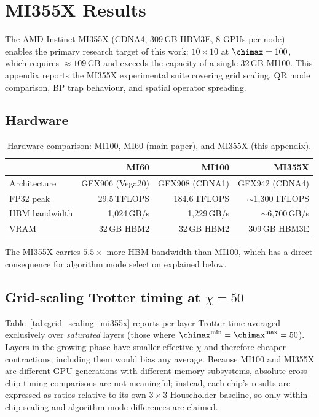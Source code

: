 \section{MI355X Results}
\label{app:mi355x}

The AMD Instinct MI355X (CDNA4, 309\,GB HBM3E, 8 GPUs per node) enables
the primary research target of this work: $10\times10$ at
$\chimax=100$, which requires $\approx 109$\,GB and exceeds the capacity of a
single 32\,GB MI100.
This appendix reports the MI355X experimental suite covering grid scaling,
QR mode comparison, BP trap behaviour, and spatial operator spreading.

\subsection{Hardware}

\begin{table}[ht]
\centering
\caption{Hardware comparison: MI100, MI60 (main paper), and MI355X (this appendix).}
\label{tab:hardware_mi355x}
\small
\begin{tabular}{lrrr}
\toprule
                  & MI60              & MI100             & MI355X \\
\midrule
Architecture      & GFX906 (Vega20)   & GFX908 (CDNA1)    & GFX942 (CDNA4) \\
FP32 peak         & 29.5\,TFLOPS      & 184.6\,TFLOPS     & $\sim$1{,}300\,TFLOPS \\
HBM bandwidth     & 1{,}024\,GB/s     & 1{,}229\,GB/s     & $\sim$6{,}700\,GB/s \\
VRAM              & 32\,GB HBM2       & 32\,GB HBM2       & 309\,GB HBM3E \\
\bottomrule
\end{tabular}
\end{table}

The MI355X carries $\mathbf{5.5\times}$ more HBM bandwidth than MI100, which
has a direct consequence for algorithm mode selection explained below.

\subsection{Grid-scaling Trotter timing at $\chi = 50$}

Table~\ref{tab:grid_scaling_mi355x} reports per-layer Trotter time averaged
exclusively over \emph{saturated} layers (those where $\chimax^{\min} =
\chimax^{\max} = 50$).
Layers in the growing phase have smaller effective $\chi$ and therefore cheaper
contractions; including them would bias any average.
Because MI100 and MI355X are different GPU generations with different memory
subsystems, absolute cross-chip timing comparisons are not meaningful;
instead, each chip's results are expressed as ratios relative to its own
$3\times3$ Householder baseline, so only within-chip scaling and
algorithm-mode differences are claimed.

